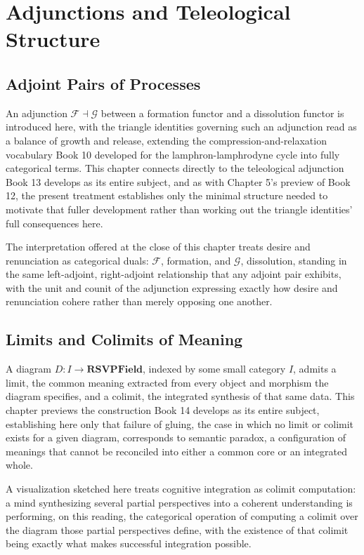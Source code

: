 \part{Adjunctions and Teleological Structure}

\chapter{Adjoint Pairs of Processes}

An adjunction $\mathcal{F} \dashv \mathcal{G}$ between a formation functor and a dissolution functor is introduced here, with the triangle identities governing such an adjunction read as a balance of growth and release, extending the compression-and-relaxation vocabulary Book 10 developed for the lamphron-lamphrodyne cycle into fully categorical terms. This chapter connects directly to the teleological adjunction Book 13 develops as its entire subject, and as with Chapter 5's preview of Book 12, the present treatment establishes only the minimal structure needed to motivate that fuller development rather than working out the triangle identities' full consequences here.

The interpretation offered at the close of this chapter treats desire and renunciation as categorical duals: $\mathcal{F}$, formation, and $\mathcal{G}$, dissolution, standing in the same left-adjoint, right-adjoint relationship that any adjoint pair exhibits, with the unit and counit of the adjunction expressing exactly how desire and renunciation cohere rather than merely opposing one another.

\chapter{Limits and Colimits of Meaning}

A diagram $D: I \to \mathbf{RSVPField}$, indexed by some small category $I$, admits a limit, the common meaning extracted from every object and morphism the diagram specifies, and a colimit, the integrated synthesis of that same data. This chapter previews the construction Book 14 develops as its entire subject, establishing here only that failure of gluing, the case in which no limit or colimit exists for a given diagram, corresponds to semantic paradox, a configuration of meanings that cannot be reconciled into either a common core or an integrated whole.

A visualization sketched here treats cognitive integration as colimit computation: a mind synthesizing several partial perspectives into a coherent understanding is performing, on this reading, the categorical operation of computing a colimit over the diagram those partial perspectives define, with the existence of that colimit being exactly what makes successful integration possible.

